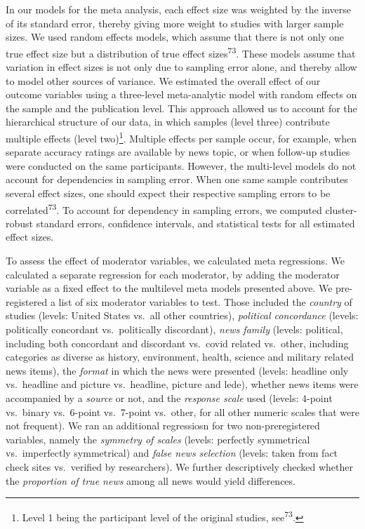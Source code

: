 \documentclass[
  doc,floatsintext]{apa6}
\begin{document}
In our models for the meta analysis, each effect size was weighted by the inverse of its standard error, thereby giving more weight to studies with larger sample sizes. We used random effects models, which assume that there is not only one true effect size but a distribution of true effect sizes\textsuperscript{73}. These models assume that variation in effect sizes is not only due to sampling error alone, and thereby allow to model other sources of variance. We estimated the overall effect of our outcome variables using a three-level meta-analytic model with random effects on the sample and the publication level. This approach allowed us to account for the hierarchical structure of our data, in which samples (level three) contribute multiple effects (level two)\footnote{Level 1 being the participant level of the original studies, see\textsuperscript{73}.}. Multiple effects per sample occur, for example, when separate accuracy ratings are available by news topic, or when follow-up studies were conducted on the same participants. However, the multi-level models do not account for dependencies in sampling error. When one same sample contributes several effect sizes, one should expect their respective sampling errors to be correlated\textsuperscript{73}. To account for dependency in sampling errors, we computed cluster-robust standard errors, confidence intervals, and statistical tests for all estimated effect sizes.

To assess the effect of moderator variables, we calculated meta regressions. We calculated a separate regression for each moderator, by adding the moderator variable as a fixed effect to the multilevel meta models presented above. We pre-registered a list of six moderator variables to test. Those included the \emph{country} of studies (levels: United States vs.~all other countries), \emph{political concordance} (levels: politically concordant vs.~politically discordant), \emph{news family} (levels: political, including both concordant and discordant vs.~covid related vs.~other, including categories as diverse as history, environment, health, science and military related news items), the \emph{format} in which the news were presented (levels: headline only vs.~headline and picture vs.~headline, picture and lede), whether news items were accompanied by a \emph{source} or not, and the \emph{response scale} used (levels: 4-point vs.~binary vs.~6-point vs.~7-point vs.~other, for all other numeric scales that were not frequent). We ran an additional regressiosn for two non-preregistered variables, namely the \emph{symmetry of scales} (levels: perfectly symmetrical vs.~imperfectly symmetrical) and \emph{false news selection} (levels: taken from fact check sites vs.~verified by researchers). We further descriptively checked whether the \emph{proportion of true news} among all news would yield differences.
\end{document}
